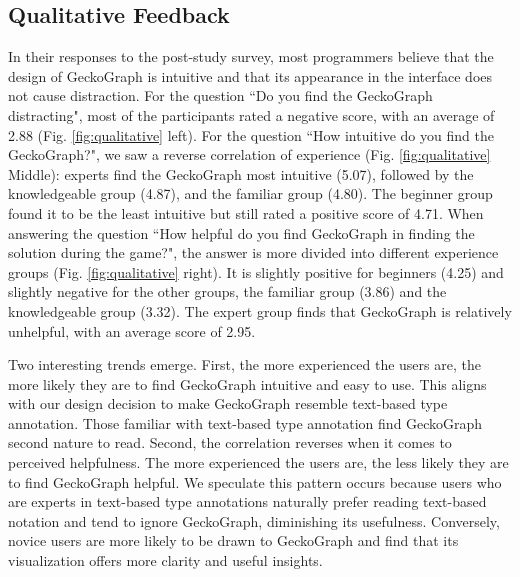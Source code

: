 \documentclass[preprint,12pt]{elsarticle}
\begin{document}
\subsection{Qualitative Feedback}
In their responses to the post-study survey, most programmers believe that the design of GeckoGraph is intuitive and that its appearance in the interface does not cause distraction.
For the question ``Do you find the GeckoGraph distracting", most of the participants rated a negative score, with an average of 2.88 (Fig. \ref{fig:qualitative} left). For the question ``How intuitive do you find the GeckoGraph?", we saw a reverse correlation of experience (Fig. \ref{fig:qualitative} Middle): experts find the GeckoGraph most intuitive (5.07), followed by the knowledgeable group (4.87), and the familiar group (4.80). The beginner group found it to be the least intuitive but still rated a positive score of 4.71. 
When answering the question ``How helpful do you find GeckoGraph in finding the solution during the game?", the answer is more divided into different experience groups (Fig. \ref{fig:qualitative} right). It is slightly positive for beginners (4.25) and slightly negative for the other groups, the familiar group (3.86) and the knowledgeable group (3.32). The expert group finds that GeckoGraph is relatively unhelpful, with an average score of 2.95.

Two interesting trends emerge. First, the more experienced the users are, the more likely they are to find GeckoGraph intuitive and easy to use. This aligns with our design decision to make GeckoGraph resemble text-based type annotation. Those familiar with text-based type annotation find GeckoGraph second nature to read. Second, the correlation reverses when it comes to perceived helpfulness. The more experienced the users are, the less likely they are to find GeckoGraph helpful. We speculate this pattern occurs because users who are experts in text-based type annotations naturally prefer reading text-based notation and tend to ignore GeckoGraph, diminishing its usefulness. Conversely, novice users are more likely to be drawn to GeckoGraph and find that its visualization offers more clarity and useful insights.


\end{document}
